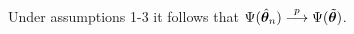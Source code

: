 \begin{theorem}
  \label{thm:multivariate-consistency}
  Under assumptions 1-3 it follows that
  $\Psi(\hat{\bm{\theta}}_n) \stackrel{p}{\longrightarrow} \Psi(\tilde{\bm{\theta}})$.
\end{theorem}


